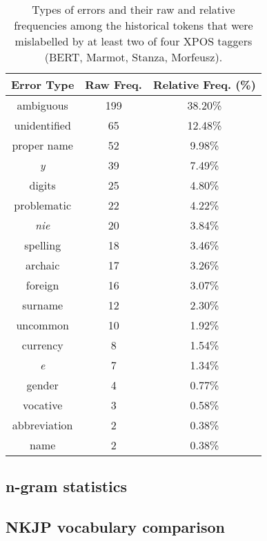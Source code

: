 \renewcommand{\arraystretch}{1.25}
\begin{table}[H]
\begin{center}
\begin{tabular}{|c|cc|}
\hline \bf Error Type & \bf Raw Freq. & \bf Relative Freq. (\%) \\ \hline
ambiguous & 199 & 38.20\% \\
unidentified & 65 & 12.48\% \\
proper name & 52 & 9.98\% \\
\textit{y} & 39 & 7.49\% \\
digits & 25 & 4.80\% \\
problematic & 22 & 4.22\% \\
\textit{nie} & 20 & 3.84\% \\
spelling & 18 & 3.46\% \\
archaic & 17 & 3.26\% \\
foreign & 16 & 3.07\% \\
surname & 12 & 2.30\% \\
uncommon & 10 & 1.92\% \\
currency & 8 & 1.54\% \\
\textit{e} & 7 & 1.34\% \\
gender & 4 & 0.77\% \\
vocative & 3 & 0.58\% \\
abbreviation & 2 & 0.38\% \\
name & 2 & 0.38\% \\
\hline
\end{tabular}
\caption{\label{table:xpos-errors} Types of errors and their raw and relative frequencies among the historical tokens that were mislabelled by at least two of four XPOS taggers (BERT, Marmot, Stanza, Morfeusz).}
\end{center}
\end{table}

\subsection{n-gram statistics}
\label{subsec:ngram-stats-results}

\subsection{NKJP vocabulary comparison}
\label{subsec:nkjp-comparison-results}